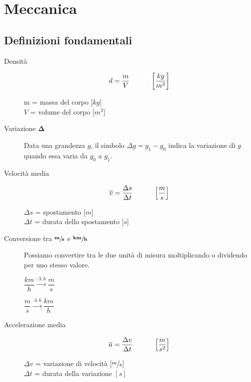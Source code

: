 \documentclass[a4paper,11pt,italian]{article}
\begin{document}
\newpage
\section{Meccanica}

\subsection{Definizioni fondamentali}

\begin{description}
  \item[Densità] 
  \[ d = \frac{m}{V} \hspace*{3em} \left[ \frac{kg}{m^3} \right] \]
  \begin{multicols}{2}
  m = massa del corpo [$ kg $]\\
  $ V $ = volume del corpo [$ m^3 $]
  \end{multicols}
  
  \item[Variazione $ \mathbf{\Delta} $] 
  Data una grandezza $ g $, il simbolo $ \Delta g = g_1 - g_0 $ indica la variazione di $ g $ quando essa varia da $ g_0 $ a $ g_1 $.
  
  \item[Velocità media]
  \[ \overline{v} = \frac{\Delta s}{\Delta t} \hspace*{3em} \left[ \frac{m}{s} \right] \]
  \begin{multicols}{2}
  $ \Delta s $ = spostamento [$ m $]\\
  $ \Delta t $ = durata dello spostamento [$ s $]
  \end{multicols}
  
  \item[Conversione tra $ \sfrac{\mathbf{m}}{\mathbf{s}} $ e $ \sfrac{\mathbf{km}}{\mathbf{h}} $] 
  Possiamo convertire tra le due unità di misura moltiplicando o dividendo per uno stesso valore.
  \begin{multicols}{2}\begin{center}
  $ \dfrac{km}{h} \xrightarrow{: 3,6} \dfrac{m}{s} $
   
  $ \dfrac{m}{s} \xrightarrow{\cdot 3,6} \dfrac{km}{h} $
  \end{center}\end{multicols}
  
  \item[Accelerazione media] 
  \[ \overline{a} = \frac{\Delta v}{\Delta t} \hspace*{3em} \left[ \frac{m}{s^2} \right]  \]
  \begin{multicols}{2}
  $ \Delta v $ = variazione di velocità [$ \sfrac{m}{s}$]\\
  $ \Delta t $ = durata della variazione $ [s] $
  \end{multicols}
  

\end{description}
\end{document}
